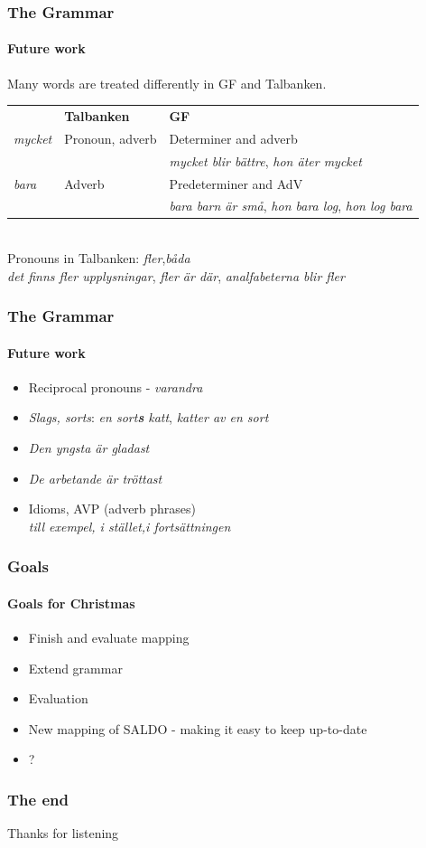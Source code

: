 \documentclass[10pt]{beamer}
\renewcommand{\baselinestretch}{1.5}
\begin{document}
\begin{frame}
 \renewcommand{\baselinestretch}{1.0}
\frametitle{The Grammar}
\framesubtitle{Future work} 
Many words are treated differently in GF and Talbanken. \\
\begin{tabular}{lll}
& \textbf{Talbanken} & \textbf{GF} \\
\emph{mycket} & Pronoun, adverb &  Determiner and adverb\\
& &\emph{mycket blir bättre}, \emph{hon äter mycket}\\
\pause
\emph{bara} & Adverb & Predeterminer and AdV \\ %
& &\emph{bara barn är små}, \emph{hon bara log}, \emph{hon log bara} \\
\end{tabular} \\
\vspace{0.5cm}
\pause
Pronouns in Talbanken:
\emph{fler},\emph{båda}\\
   \emph{det finns fler upplysningar}, \emph{fler är där}, \emph{analfabeterna blir fler} %
\end{frame}

\begin{frame}
 \renewcommand{\baselinestretch}{1.0}
\frametitle{The Grammar}
\framesubtitle{Future work} 
\begin{itemize}
\item{Reciprocal pronouns - \emph{varandra }}
\pause
\item{\emph{Slags, sorts}: \emph{en sort\textbf{s} katt}, \emph{katter av en sort}}
\pause
\item{\emph{Den yngsta    är gladast}}
\pause
\item{\emph{De  arbetande är tröttast}}
\pause
\item{Idioms, AVP (adverb phrases)\\
\emph{till exempel, i stället,i fortsättningen}}
\end{itemize}
\end{frame}

\begin{frame}
\frametitle{Goals}
\framesubtitle{Goals for Christmas} 
\begin{itemize}
\item{Finish and evaluate mapping}
\pause
\item{Extend grammar}
\pause
\item{Evaluation}
\pause
\item{New mapping of SALDO - making it easy to keep up-to-date}
\pause
\item{?}
\end{itemize}
\end{frame}

\begin{frame}
    \frametitle{The end}
\large\begin{center}Thanks for listening\end{center}
\end{frame}
\end{document}
